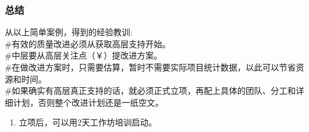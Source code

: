 \hypertarget{ux603bux7ed3}{%
\subsubsection{总结}\label{ux603bux7ed3}}

从以上简单案例，得到的经验教训:\\
\#有效的质量改进必须从获取高层支持开始。\\
\#中层要从高层关注点（￥）提改进方案。\\
\#在做改进方案时，只需要估算，暂时不需要实际项目统计数据，以此可以节省资源和时间。\\
\#如果确实有高层真正支持的话，就必须正式立项，再配上具体的团队、分工和详细计划，否则整个改进计划还是一纸空文。

\begin{enumerate}
\tightlist
\item
  立项后，可以用2天工作坊培训启动。
\end{enumerate}




